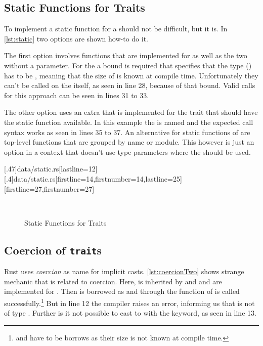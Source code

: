 \documentclass[thesis]{subfiles}
\begin{document}
  \subsection{Static Functions for Traits}
    To implement a static function for a \trait should not be difficult, but it is.
    In \autoref{lst:static} two options are shown how-to do it.

    The first option involves functions that are implemented for \Foo as well as the two \traits without a \self parameter.
    For the \traits a bound is required that specifies that the \self type (\Self) has to be \Sized, meaning that the size of \Self is known at compile time.
    Unfortunately they can't be called on the \trait itself, as seen in line 28, because of that bound.
    Valid calls for this approach can be seen in lines 31 to 33.

    The other option uses an extra \trait that is implemented for the trait that should have the static function available.
    In this example the \trait is named  and the expected call syntax works as seen in lines 35 to 37.
    An alternative for static functions of \traits are top-level functions that are grouped by name or module.
    This however is just an option in a context that doesn't use type parameters where the \trait should be used.

    \LstTikzBox{\staticOne}[.47\linewidth]{data/static.rs}[lastline=12]
    \LstTikzBox{\staticTwo}[.4\linewidth]{data/static.rs}[firstline=14,firstnumber=14,lastline=25]
    [firstline=27,firstnumber=27]
    \begin{figure}[ht]
      \captionsetup{type=lstlisting}
      \centering
      \usebox{\staticOne}\hfill%
      \usebox{\staticTwo}\\\vspace*{.75em}%
      \usebox{\staticThree}
      \caption{Static Functions for Traits}\label{lst:static}
    \end{figure}

  \subsection{Coercion of \texttt{trait}s}
    Rust uses \emph{coercion} as name for implicit casts.
    \autoref{lst:coercionTwo} shows strange mechanic that is related to coercion.
    Here, \A is inherited by \B and \B and \A are implemented for \Foo.
    Then  is borrowed as  and through  the function \fun of \A is called successfully.\footnote{
       and  have to be borrows as their size is not known at compile time.\autocite[E0277 referes to 19.4 Advanced Types]{rust-doc}
    }
    But in line 12 the compiler raises an error, informing us that  is not of type \A.
    Further is it not possible to cast  to  with the  keyword, as seen in line 13.
\end{document}
